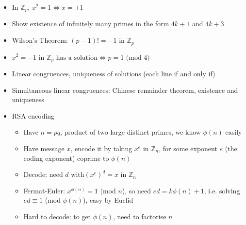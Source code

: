 \begin{itemize}
      \item In $\mathbb{Z}_{p}$, $x^{2}=1\iff x=\pm1$
      \item Show existence of infinitely many primes in the form $4k+1$ and $4k+3$
      \item Wilson's Theorem: $(p-1)!=-1\textrm{ in }\mathbb{Z}_{p}$
      \item $x^{2}=-1\textrm{ in }\mathbb{Z}_{p}\textrm{ has a solution}\iff p=1\textrm{ (mod }4)$
      \item Linear congruences, uniqueness of solutions (each line if and only
            if)
      \item Simultaneous linear congruences: Chinese remainder theorem, existence
            and uniqueness
      \item RSA encoding
            \begin{itemize}
                  \item Have $n=pq$, product of two large distinct primes, we know $\phi(n)$
                        easily
                  \item Have message $x$, encode it by taking $x^{e}$ in $\mathbb{Z}_{n}$,
                        for some exponent $e$ (the coding exponent) coprime to $\phi(n)$
                  \item Decode: need $d$ with$\left(x^{e}\right)^{d}=x$ in $\mathbb{Z}_{n}$
                  \item Fermat-Euler: $x^{\phi(n)}=1$ (mod $n$), so need $ed=k\phi(n)+1$,
                        i.e. solving $ed\equiv1$ (mod $\phi(n)$), easy by Euclid
                  \item Hard to decode: to get $\phi(n)$, need to factorise $n$
            \end{itemize}
\end{itemize}



